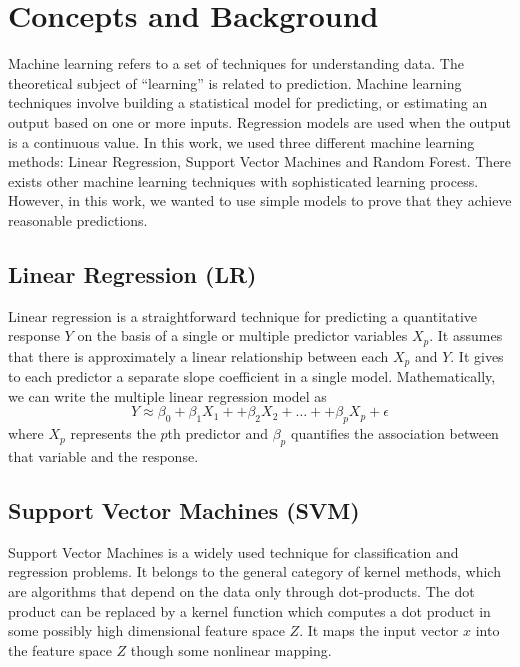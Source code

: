 \section{Concepts and Background}\label{sec:backgroundML}
Machine learning refers to a set of techniques for understanding data. The theoretical subject of ``learning'' is related to prediction. Machine learning techniques involve building a statistical model for predicting, or estimating an output based on one or more inputs. Regression models are used when the output is a continuous value. In this work, we used three different machine learning methods: Linear Regression, Support Vector Machines and Random Forest. There exists other machine learning techniques with sophisticated learning process. However, in this work, we wanted to use simple models to prove that they achieve reasonable predictions.

\subsection{Linear Regression (LR)}
Linear regression is a straightforward technique for predicting a quantitative response $Y$ on the basis of a single or multiple predictor variables $X_p$. It assumes that there is approximately a linear relationship between each $X_p$ and $Y$. It gives to each predictor a separate slope coefficient in a single model. Mathematically, we can write the multiple linear regression model as
\begin{equation}
Y \approx \beta_0 + \beta_1 X_1 + + \beta_2 X_2 + \ldots + + \beta_p X_p + \epsilon
\end{equation}
where $X_p$ represents the $p$th predictor and $\beta_p$ quantifies the association between that variable and the response.

\subsection{Support Vector Machines (SVM)}
Support Vector Machines is a widely used technique for classification and regression problems. It belongs to the general category of kernel methods, which are algorithms that depend on the data only through dot-products. The dot product can be replaced by a kernel function which computes a dot product in some possibly high dimensional feature space $Z$. It maps the input vector $x$ into the feature space $Z$ though some nonlinear mapping. 

